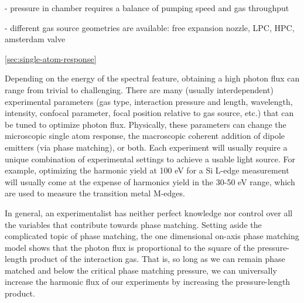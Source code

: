 - pressure in chamber requires a balance of pumping speed and gas throughput

- different gas source geometries are available: free expansion nozzle, LPC, HPC, amsterdam valve


\cref{sec:single-atom-response}



Depending on the energy of the spectral feature, obtaining a high photon flux can range from trivial to challenging. There are many (usually interdependent) experimental parameters (gas type, interaction pressure and length, wavelength, intensity, confocal parameter, focal position relative to gas source, etc.) that can be tuned to optimize photon flux. Physically, these parameters can change the microscopic single atom response, the macroscopic coherent addition of dipole emitters (via phase matching), or both. Each experiment will usually require a unique combination of experimental settings to achieve a usable light source. For example, optimizing the harmonic yield at 100 eV for a Si L-edge measurement will usually come at the expense of harmonics yield in the 30-50 eV range, which are used to measure the transition metal M-edges.

In general, an experimentalist has neither perfect knowledge nor control over all the variables that contribute towards phase matching. Setting aside the complicated topic of phase matching, the one dimensional on-axis phase matching model\cite{constantOptimizingHighHarmonic1999} shows that the photon flux is proportional to the square of the pressure-length product of the interaction gas. That is, so long as we can remain phase matched and below the critical phase matching pressure\cite{popmintchevPhaseMatchingHigh2009}, we can universally increase the harmonic flux of our experiments by increasing the pressure-length product.

